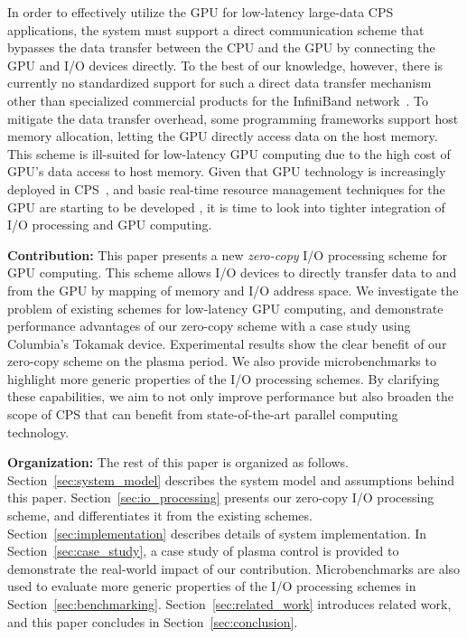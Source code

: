In order to effectively utilize the GPU for low-latency large-data CPS
applications, the system must support a direct communication scheme that
bypasses the data transfer between the CPU and the GPU by connecting the
GPU and I/O devices directly.
To the best of our knowledge, however, there is currently no
standardized support for such a direct data transfer mechanism other than
specialized commercial products for the InfiniBand
network~\cite{GPUDirect}.
To mitigate the data transfer overhead, some programming frameworks
support host memory allocation, letting the GPU directly access data on
the host memory.
This scheme is ill-suited for low-latency GPU computing due to the high
cost of GPU's data access to host memory.
Given that GPU technology is increasingly deployed in
CPS~\cite{Hirabayashi_REACTION12, Mangharam11, McNaughton_ICRA11,
Michel_IROS07}, 
and basic real-time resource management techniques for the GPU are
starting to be developed \cite{Elliott_RTS12, Elliott_ECRTS12, Kato_RTAS11,
Kato_RTSS11, Kato_ATC11, Kato_ATC12, Liu_PACT12}, it is time to look
into tighter integration of I/O processing and GPU computing.

\textbf{Contribution:}
This paper presents a new \emph{zero-copy} I/O processing scheme for GPU
computing.
This scheme allows I/O devices to directly transfer data to and from the
GPU by mapping of memory and I/O address space.
We investigate the problem of existing schemes for low-latency GPU
computing, and demonstrate performance advantages of our zero-copy
scheme with a case study using Columbia's Tokamak device.
Experimental results show the clear benefit of our zero-copy scheme on
the plasma period.
We also provide microbenchmarks to highlight more generic
properties of the I/O processing schemes.
By clarifying these capabilities, we aim to not only improve performance
but also broaden the scope of CPS that can benefit from state-of-the-art
parallel computing technology.

\textbf{Organization:}
The rest of this paper is organized as follows.
Section~\ref{sec:system_model} describes the system model and
assumptions behind this paper.
Section~\ref{sec:io_processing} presents our zero-copy I/O processing
scheme, and differentiates it from the existing schemes.
Section~\ref{sec:implementation} describes details of system
implementation.
In Section~\ref{sec:case_study}, a case study of plasma control is
provided to demonstrate the real-world impact of our contribution.
Microbenchmarks are also used to evaluate more generic properties of the
I/O processing schemes in Section~\ref{sec:benchmarking}.
Section~\ref{sec:related_work} introduces related work, and this paper
concludes in Section~\ref{sec:conclusion}.